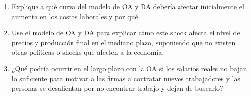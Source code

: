 \documentclass[11pt,addpoints]{article}
\begin{document}
\begin{enumerate}[label=\alph*)]
  \item Explique a qué curva del modelo de OA y DA debería afectar inicialmente el aumento en los costos laborales y por qué.
  \item Use el modelo de OA y DA para explicar cómo este shock afecta el nivel de precios y producción final en el mediano plazo, suponiendo que no existen otras políticas o shocks que afecten a la economía.
  \item ¿Qué podría ocurrir en el largo plazo con la OA si los salarios reales no bajan lo suficiente para motivar a las firmas a contratar nuevos trabajadores y las personas se desalientan por no encontrar trabajo y dejan de buscarlo?
\end{enumerate}
\end{document}
